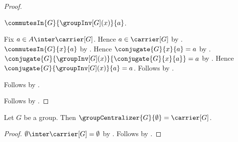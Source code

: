 \begin{proof}
\begin{subproof}
            $\commutesIn{G}{\groupInv[G](x)}{a}$.
        \begin{subproof}
            Fix $a\in A\inter\carrier[G]$.
            Hence $a\in\carrier[G]$ by .
            $\commutesIn{G}{x}{a}$ by
                .
            Hence $\conjugate{G}{x}{a}=a$ by
                .
            $\conjugate{G}{\groupInv[G](x)}{
                \conjugate{G}{x}{a}}=a$ by
                .
            Hence $\conjugate{G}{\groupInv[G](x)}{a}=a$.
            Follows by .
        \end{subproof}
        Follows by .
    \end{subproof}
    Follows by .
\end{proof}

\begin{proposition}\label{centralizer_of_emptyset}
    Let $G$ be a group.
    Then $\groupCentralizer{G}{\emptyset}=\carrier[G]$.
\end{proposition}
\begin{proof}
    $\emptyset\inter\carrier[G]=\emptyset$ by
        .
    Follows by .
\end{proof}
